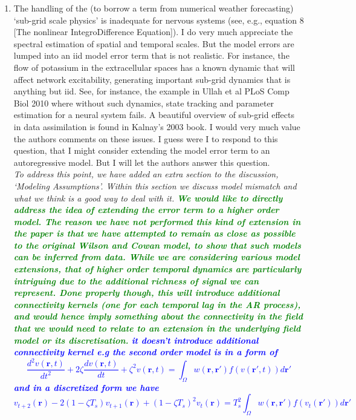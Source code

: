 \documentclass{article}
\newcommand{\mike}[1]{\textsf{\emph{\textbf{\textcolor{green}{#1}}}}}
\newcommand{\parham}[1]{\textsf{\emph{\textbf{\textcolor{blue}{#1}}}}}
\begin{document}
\begin{enumerate}
    \item The handling of the (to borrow a term from numerical weather forecasting) `sub-grid scale physics' is inadequate for nervous systems (see, e.g., equation 8 [The nonlinear IntegroDifference Equation]). I do very much appreciate the spectral estimation of spatial and temporal scales. But the model errors are lumped into an iid model error term that is not realistic. For instance, the flow of potassium in the extracellular spaces has a known dynamic that will affect network excitability, generating important sub-grid dynamics that is anything but iid. See, for instance, the example in Ullah et al PLoS Comp Biol 2010 where without such dynamics, state tracking and parameter estimation for a neural system fails. A beautiful overview of sub-grid effects in data assimilation is found in Kalnay's 2003 book. I would very much value the authors comments on these issues. I guess were I to respond to this question, that I might consider extending the model error term to an autoregressive model. But I will let the authors answer this question.\\

	\emph{To address this point, we have added an extra section to the discussion, `Modeling Assumptions'. Within this section we discuss model mismatch and what we think is a good way to deal with it.}
	\emph{\mike{We would like to directly address the idea of extending the error term to a higher order model. The reason we have not performed this kind of extension in the paper is that we have attempted to remain as close as possible to the original Wilson and Cowan model, to show that such models can be inferred from data. While we are considering various model extensions, that of higher order temporal dynamics are particularly intriguing due to the additional richness of signal we can represent. Done properly though, this will introduce additional connectivity kernels (one for each temporal lag in the AR process), and would hence imply something about the connectivity in the field that we would need to relate to an extension in the underlying field model or its discretisation.}
	\parham{it doesn't introduce additional connectivity kernel e.g the second order model is in a form of \begin{equation}
 \frac{d^2v(\mathbf r,t)}{dt^2}+2\zeta \frac{dv(\mathbf
r,t)}{dt}+\zeta^2v(\mathbf r,t)=\int_\Omega  {w\left( \mathbf{r},\mathbf{r}' \right)f\left( v\left(
\mathbf{r}',t \right) \right)d\mathbf{r}'} 
\end{equation}
and in a discretized form we have
\begin{equation}
 v_{t+2}(\mathbf r)-2(1-\zeta T_s)v_{t+1}(\mathbf r)+(1-\zeta T_s)^2v_t(\mathbf r)= T_s^2\int_\Omega  {w\left( \mathbf{r},\mathbf{r}' \right)f\left( v_t\left(
\mathbf{r}'\right) \right)d\mathbf{r}'} 
\end{equation}}}


\end{enumerate}
\end{document}
